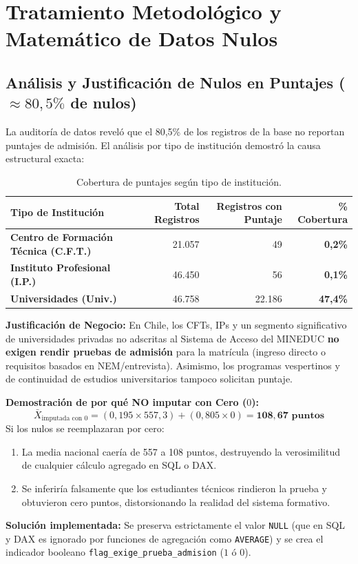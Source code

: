 \documentclass[11pt,a4paper]{article}
\begin{document}
\section{Tratamiento Metodológico y Matemático de Datos Nulos}

\subsection{Análisis y Justificación de Nulos en Puntajes ($\approx 80,5\%$ de nulos)}
La auditoría de datos reveló que el 80,5\% de los registros de la base no reportan puntajes de admisión. El análisis por tipo de institución demostró la causa estructural exacta:

\begin{table}[h!]
\centering
\small
\begin{tabular}{|l|r|r|r|}
\hline
\textbf{Tipo de Institución} & \textbf{Total Registros} & \textbf{Registros con Puntaje} & \textbf{\% Cobertura} \\
\hline
\textbf{Centro de Formación Técnica (C.F.T.)} & 21.057 & 49 & \textbf{0,2\%} \\
\textbf{Instituto Profesional (I.P.)} & 46.450 & 56 & \textbf{0,1\%} \\
\textbf{Universidades (Univ.)} & 46.758 & 22.186 & \textbf{47,4\%} \\
\hline
\end{tabular}
\caption{Cobertura de puntajes según tipo de institución.}
\end{table}

\textbf{Justificación de Negocio:} En Chile, los CFTs, IPs y un segmento significativo de universidades privadas no adscritas al Sistema de Acceso del MINEDUC \textbf{no exigen rendir pruebas de admisión} para la matrícula (ingreso directo o requisitos basados en NEM/entrevista). Asimismo, los programas vespertinos y de continuidad de estudios universitarios tampoco solicitan puntaje.

\textbf{Demostración de por qué NO imputar con Cero ($0$):}
\begin{equation}
\bar{X}_{\text{imputada con 0}} = (0,195 \times 557,3) + (0,805 \times 0) = \mathbf{108,67 \text{ puntos}}
\end{equation}
Si los nulos se reemplazaran por cero:
\begin{enumerate}
    \item La media nacional caería de 557 a 108 puntos, destruyendo la verosimilitud de cualquier cálculo agregado en SQL o DAX.
    \item Se inferiría falsamente que los estudiantes técnicos rindieron la prueba y obtuvieron cero puntos, distorsionando la realidad del sistema formativo.
\end{enumerate}
\textbf{Solución implementada:} Se preserva estrictamente el valor \texttt{NULL} (que en SQL y DAX es ignorado por funciones de agregación como \texttt{AVERAGE}) y se crea el indicador booleano \texttt{flag\_exige\_prueba\_admision} ($1$ ó $0$).
\end{document}
